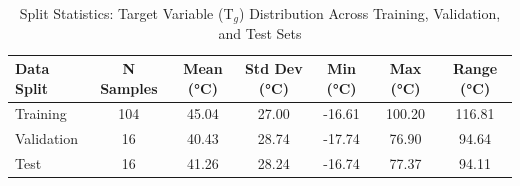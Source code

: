 
\begin{table}[h]
\centering
\caption{Split Statistics: Target Variable (T$_g$) Distribution Across Training, Validation, and Test Sets}
\label{tab:split_statistics}
\begin{tabular}{lcccccc}
\hline
\textbf{Data Split} & \textbf{N Samples} & \textbf{Mean (°C)} & \textbf{Std Dev (°C)} & \textbf{Min (°C)} & \textbf{Max (°C)} & \textbf{Range (°C)} \\
\hline
Training   & 104 & 45.04 & 27.00 & -16.61 & 100.20 & 116.81 \\
Validation & 16 & 40.43 & 28.74 & -17.74 & 76.90 & 94.64 \\
Test       & 16 & 41.26 & 28.24 & -16.74 & 77.37 & 94.11 \\
\hline
\end{tabular}
\end{table}
